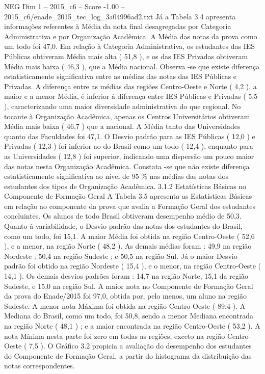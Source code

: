 \begin{textsample}{NEG Dim 1 – 2015\_c6 – Score -1.00 – 2015\_c6/enade\_2015\_tec\_log\_3a04996ad2.txt}
Já a Tabela 3.4 apresenta informações referentes à Média da nota final desagregadas por Categoria Administrativa e por Organização Acadêmica.
A Média das notas da prova como um todo foi 47,0.
Em relação à Categoria Administrativa, os estudantes das IES Públicas obtiveram Média mais alta ( 51,8 ), e os das IES Privadas obtiveram Média mais baixa ( 46,3 ), que a Média nacional.
Observa -se que existe diferença estatisticamente significativa entre as médias das notas das IES Públicas e Privadas.
A diferença entre as médias das regiões Centro-Oeste e Norte ( 4,2 ), a maior e a menor Média, é inferior à diferença entre IES Públicas e Privadas ( 5,5 ), caracterizando uma maior diversidade administrativa do que regional.
No tocante à Organização Acadêmica, apenas os Centros Universitários obtiveram Média mais baixa ( 46,7 ) que a nacional.
A Média tanto das Universidades quanto das Faculdades foi 47,1.
O Desvio padrão para as IES Públicas ( 12,0 ) e Privadas ( 12,3 ) foi inferior ao do Brasil como um todo ( 12,4 ), enquanto para as Universidades ( 12,8 ) foi superior, indicando uma dispersão um pouco maior das notas nesta Organização Acadêmica.
Constata -se que não existe diferença estatisticamente significativa ao nível de 95 \% nas médias das notas dos estudantes dos tipos de Organização Acadêmica. 3.1.2 Estatísticas Básicas no Componente de Formação Geral A Tabela 3.5 apresenta as Estatísticas Básicas em relação ao componente da prova que avalia a Formação Geral dos estudantes concluintes.
Os alunos de todo Brasil obtiveram desempenho médio de 50,3.
Quanto à variabilidade, o Desvio padrão das notas dos estudantes do Brasil, como um todo, foi 15,1.
A maior Média foi obtida na região Centro-Oeste ( 52,6 ), e a menor, na região Norte ( 48,2 ).
As demais médias foram : 49,9 na região Nordeste ; 50,4 na região Sudeste ; e 50,5 na região Sul.
Já o maior Desvio padrão foi obtido na região Nordeste ( 15,4 ), e o menor, na região Centro-Oeste ( 14,1 ).
Os demais desvios padrões foram : 14,7 na região Norte, 15,1 da região Sudeste, e 15,0 na região Sul.
A maior nota no Componente de Formação Geral da prova do Enade/2015 foi 97,0, obtida por, pelo menos, um aluno na região Sudeste.
A menor nota Máxima foi obtida na região Centro-Oeste ( 89,4 ).
A Mediana do Brasil, como um todo, foi 50,8, sendo a menor Mediana encontrada na região Norte ( 48,1 ) ; e a maior encontrada na região Centro-Oeste ( 53,2 ).
A nota Mínima nesta parte foi zero em todas as regiões, exceto na região Centro-Oeste ( 7,5 ).
O Gráfico 3.2 propicia a avaliação do desempenho dos estudantes do Componente de Formação Geral, a partir do histograma da distribuição das notas correspondentes.

\end{textsample}
